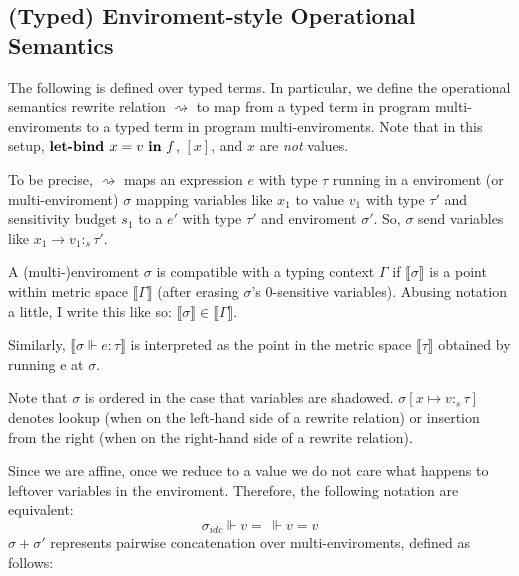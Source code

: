 \subsection{(Typed) Enviroment-style Operational Semantics}
The following is defined over typed terms. In particular, we define the
operational semantics rewrite relation $\rightsquigarrow$ to map from a typed
term in program multi-enviroments to a typed term in program multi-enviroments. Note
that in this setup, $\textbf{let-bind } x = v \ \textbf{in} \ f$, $[x]$, and $x$ are \textit{not}
values.

To be precise, $\rightsquigarrow$ maps an expression $e$ with type $\tau$
running in a enviroment (or multi-enviroment) $\sigma$ mapping variables like
$x_1$ to value $v_1$ with type $\tau'$ and sensitivity budget $s_1$ to a $e'$
with type $\tau'$ and enviroment $\sigma'$. So, $\sigma$ send variables like
$x_1 \to v_1 :_s \tau'$.

A (multi-)enviroment $\sigma$ is compatible with a typing context $\Gamma$ if
$\llbracket \sigma \rrbracket$ is a point within metric space $\llbracket \Gamma
\rrbracket$ (after erasing $\sigma$'s $0$-sensitive variables). Abusing notation
a little, I write this like so: $\llbracket \sigma \rrbracket \in \llbracket
\Gamma \rrbracket$.


Similarly, $\llbracket \sigma \Vdash e : \tau \rrbracket$ is
interpreted as the point in the metric space $\llbracket \tau \rrbracket$
obtained by running e at $\sigma$.

Note that $\sigma$ is ordered in the case that variables are shadowed. $\sigma[x
\mapsto v :_s \tau]$ denotes lookup (when on the left-hand side of a rewrite
relation) or insertion from the right (when on the right-hand side of a rewrite
relation).

Since we are affine, once we reduce to a value we do not care what happens to
leftover variables in the enviroment. Therefore, the following notation are
equivalent:
$$
\sigma_{idc} \Vdash v = \ \Vdash v = v
$$
$\sigma + \sigma'$ represents pairwise concatenation over multi-enviroments,
defined as follows:

